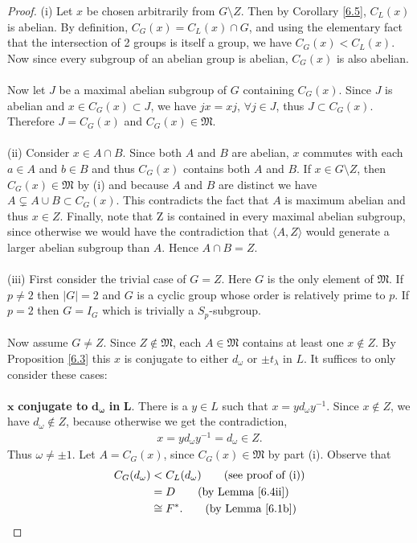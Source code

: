 \documentclass[a4paper , 11pt]{book}
\theoremstyle{definition}
\theoremstyle{remark}
\begin{document}
\begin{proof} (i) Let $x$ be chosen arbitrarily from $G \! \setminus \! Z$. Then by Corollary \ref{6.5}, $C_L(x)$ is abelian. By definition, $C_G(x) = C_L(x) \cap G$, and using the elementary fact that the intersection of 2 groups is itself a group, we have $C_G(x) < C_L(x)$. Now since every subgroup of an abelian group is abelian, $C_G(x)$ is also abelian. \\
\\
Now let $J$ be a maximal abelian subgroup of $G$ containing $C_G(x)$. Since $J$ is abelian and $x \in C_G(x) \subset J$, we have $jx=xj$, $\forall j \in J$, thus $J \subset C_G(x)$. Therefore $J=C_G(x)$ and $C_G(x) \in \mathfrak{M}$. \\
\\
(ii) Consider $x \in A \cap B$. Since both $A$ and $B$ are abelian, $x$ commutes with each $a \in A$ and $b \in B$ and thus $C_G(x)$ contains both $A$ and $B$.  If $x \in G \setminus Z$, then $C_G(x) \in \mathfrak{M}$ by (i) and because $A$ and $B$ are distinct we have $A \subsetneq A \cup B \subset C_G(x)$. This contradicts the fact that $A$ is maximum abelian and thus $x \in Z$. Finally, note that Z is contained in every maximal abelian subgroup, since otherwise we would have the contradiction that $\langle A, Z \rangle$ would generate a larger abelian subgroup than $A$. Hence $A \cap B = Z$. \\
\\
(iii) First consider the trivial case of $G=Z$. Here $G$ is the only element of $\mathfrak{M}$. If $p \neq 2$ then $|G|=2$ and $G$ is a cyclic group whose order is relatively prime to $p$. If $p=2$ then $G = I_G$ which is trivially a $S_p$-subgroup. \\
\\
Now assume $G \neq Z$. Since $Z \not \in \mathfrak{M}$, each $A \in \mathfrak{M}$ contains at least one $x \not \in Z$. By Proposition  \ref{6.3} this $x$ is conjugate to either $d_\omega$ or $\pm t_\lambda$ in $L$. It suffices to only consider these cases: \\
\\
\textbullet \space $\pmb{x}$ \textbf{conjugate to} $\pmb{d_\omega}$ \textbf{in} $\pmb {L}$. There is a $y \in L$ such that $x = y d_\omega y^{-1}$. Since $x \not \in Z$, we have $d_\omega \not \in Z$, because otherwise we get the contradiction,
\begin{align*} x =  y d_\omega y^{-1} = d_\omega \in Z.
\end{align*}
Thus $\omega \neq \pm 1$. Let $A = C_G(x)$, since $C_G(x) \in \mathfrak{M}$ by part (i). Observe that
\begin{align*}  C_G(d_\omega) &<  C_L(d_\omega)  \tag{see proof of (i)}
\\ &= D  \tag{by Lemma \ref{6.4ii}}
\\ &\cong F^*.  \tag{by Lemma \ref{6.1b}}
\end{align*}


\end{proof}
\end{document}
